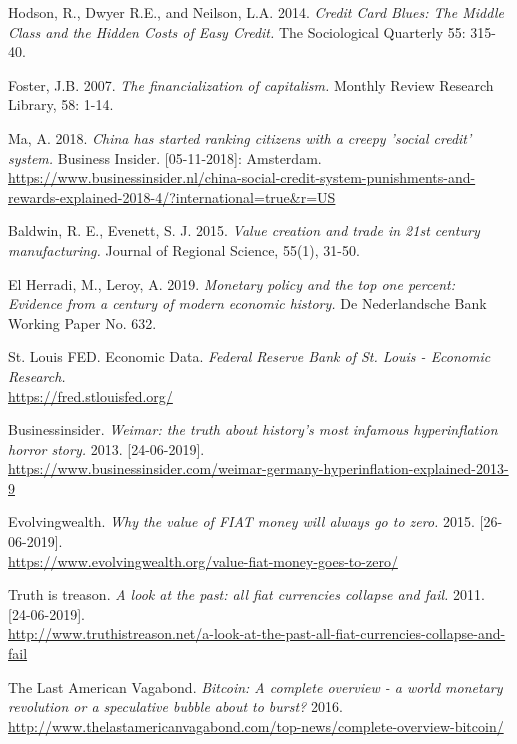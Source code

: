 \begin{thebibliography}{25}
Hodson, R., Dwyer R.E., and Neilson, L.A. 2014. \emph{Credit Card Blues: The Middle Class and the Hidden Costs of Easy Credit.} The Sociological Quarterly 55: 315-40. 

Foster, J.B. 2007. \emph{The financialization of capitalism.} Monthly Review Research Library, 58: 1-14. 

Ma, A. 2018. \textit{China has started ranking citizens with a creepy 'social credit' system.} 
Business Insider. [05-11-2018]: Amsterdam.\\
\url{https://www.businessinsider.nl/china-social-credit-system-punishments-and-rewards-explained-2018-4/?international=true&r=US}

 Baldwin, R. E., Evenett, S. J. 2015. \emph{Value creation and trade in 21st century manufacturing.} Journal of Regional Science, 55(1), 31-50.

 El Herradi, M., Leroy, A. 2019. \emph{Monetary policy and the top one percent: Evidence from a century of modern economic history.} De Nederlandsche Bank Working Paper No. 632.

St. Louis FED. Economic Data. \emph{Federal Reserve Bank of St. Louis - Economic Research.}\\
\url{https://fred.stlouisfed.org/}

Businessinsider. \emph{Weimar: the truth about history's most infamous hyperinflation horror story.}
2013. [24-06-2019].\\
\url{https://www.businessinsider.com/weimar-germany-hyperinflation-explained-2013-9}

Evolvingwealth. \emph{Why the value of FIAT money will always go to zero.} 2015. [26-06-2019].\\
\url{https://www.evolvingwealth.org/value-fiat-money-goes-to-zero/}

Truth is treason. \emph{A look at the past: all fiat currencies collapse and fail.}
2011. [24-06-2019].\\
\url{http://www.truthistreason.net/a-look-at-the-past-all-fiat-currencies-collapse-and-fail}

The Last American Vagabond.
\emph{Bitcoin: A complete overview - a world monetary revolution or a speculative bubble about to burst?} 2016.\\
\url{http://www.thelastamericanvagabond.com/top-news/complete-overview-bitcoin/}


\end{thebibliography}

